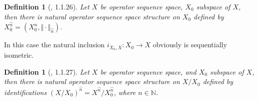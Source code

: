 \documentclass[12pt]{article}
\newtheorem{definition}[theorem]{Definition}
\begin{document}
\begin{definition}[\cite{LamOpFolgen}, 1.1.26]\label{DefSQSubSpace}
Let $X$ be operator sequence space, $X_0$ subspace of $X$, then there is natural operator sequence space structure on $X_0$ defined by $X_0^{\wideparen{n}}=(X_0^n,\Vert\cdot\Vert_{\wideparen{n}})$.
\end{definition}

In this case the natural inclusion $i_{X_0,X}:X_0\to X$ obviously is sequentially isometric.

\begin{definition}[\cite{LamOpFolgen}, 1.1.27]\label{DefSQFactorSpace}
Let $X$ be operator sequence space, and $X_0$ subspace of $X$, then there is natural operator sequence space structure on $X / X_0$ defined by identifications 
$(X / X_0)^{\wideparen{n}} = X^{\wideparen{n}} / X_0^{\wideparen{n}}$, where $n\in\mathbb{N}$. 
\end{definition}
\end{document}

